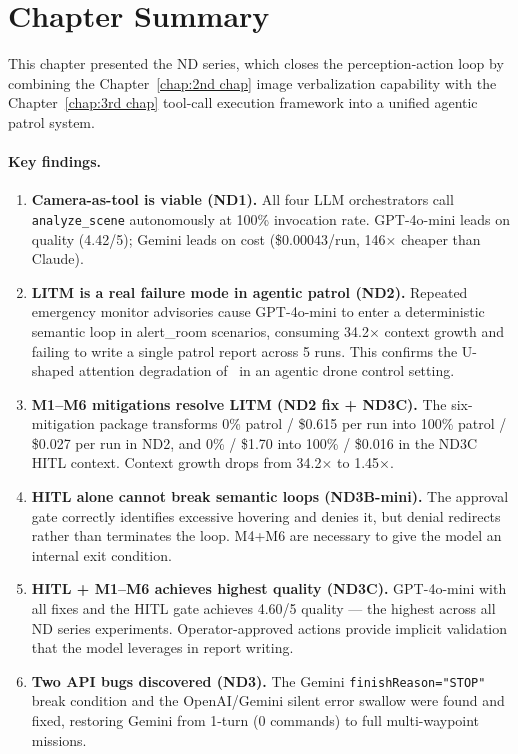 \section{Chapter Summary}
\label{sec:ch4_summary}

This chapter presented the ND series, which closes the perception-action loop by combining
the Chapter~\ref{chap:2nd chap} image verbalization capability with the Chapter~\ref{chap:3rd chap}
tool-call execution framework into a unified agentic patrol system.

\paragraph{Key findings.}

\begin{enumerate}
  \item \textbf{Camera-as-tool is viable (ND1).}  All four LLM orchestrators call
    \texttt{analyze\_scene} autonomously at 100\% invocation rate.  GPT-4o-mini leads on
    quality (4.42/5); Gemini leads on cost (\$0.00043/run, 146$\times$ cheaper than Claude).

  \item \textbf{LITM is a real failure mode in agentic patrol (ND2).}  Repeated emergency
    monitor advisories cause GPT-4o-mini to enter a deterministic semantic loop in
    alert\_room scenarios, consuming 34.2$\times$ context growth and failing to write a
    single patrol report across 5 runs.  This confirms the U-shaped attention degradation
    of~\citet{liu2023lostinthemiddle} in an agentic drone control setting.

  \item \textbf{M1--M6 mitigations resolve LITM (ND2 fix + ND3C).}  The six-mitigation
    package transforms 0\% patrol / \$0.615 per run into 100\% patrol / \$0.027 per run in
    ND2, and 0\% / \$1.70 into 100\% / \$0.016 in the ND3C HITL context.  Context growth
    drops from 34.2$\times$ to 1.45$\times$.

  \item \textbf{HITL alone cannot break semantic loops (ND3B-mini).}  The approval gate
    correctly identifies excessive hovering and denies it, but denial redirects rather than
    terminates the loop.  M4+M6 are necessary to give the model an internal exit condition.

  \item \textbf{HITL + M1--M6 achieves highest quality (ND3C).}  GPT-4o-mini with all
    fixes and the HITL gate achieves 4.60/5 quality --- the highest across all ND series
    experiments.  Operator-approved actions provide implicit validation that the model
    leverages in report writing.

  \item \textbf{Two API bugs discovered (ND3).}  The Gemini \texttt{finishReason="STOP"}
    break condition and the OpenAI/Gemini silent error swallow were found and fixed,
    restoring Gemini from 1-turn (0 commands) to full multi-waypoint missions.
\end{enumerate}

